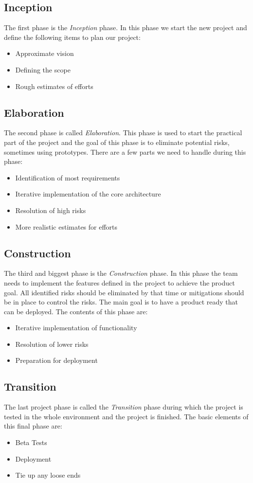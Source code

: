 \subsection{Inception}
The first phase is the \textit{Inception} phase. In this phase we start the new project and  define the following items to plan our project:
\begin{itemize}
    \item Approximate vision
    \item Defining the scope
    \item Rough estimates of efforts
\end{itemize}

\subsection{Elaboration}
The second phase is called \textit{Elaboration}. This phase is used to start the practical part of the project and the goal of this phase is to eliminate potential risks, sometimes using prototypes. There are a few parts we need to handle during this phase:
\begin{itemize}
    \item Identification of most requirements
    \item Iterative implementation of the core architecture
    \item Resolution of high risks
    \item More realistic estimates for efforts
\end{itemize}

\subsection{Construction}
The third and biggest phase is the \textit{Construction} phase. In this phase the team needs to implement the features defined in the project to achieve the product goal. All identified risks should be eliminated by that time or mitigations should be in place to control the risks. The main goal is to have a product ready that can be deployed.
The contents of this phase are:
\begin{itemize}
    \item Iterative implementation of functionality
    \item Resolution of lower risks
    \item Preparation for deployment
\end{itemize}

\subsection{Transition}
The last project phase is called the \textit{Transition} phase during which the project is tested in the whole environment and the project is finished.
The basic elements of this final phase are:
\begin{itemize}
    \item Beta Tests
    \item Deployment
    \item Tie up any loose ends
\end{itemize}

